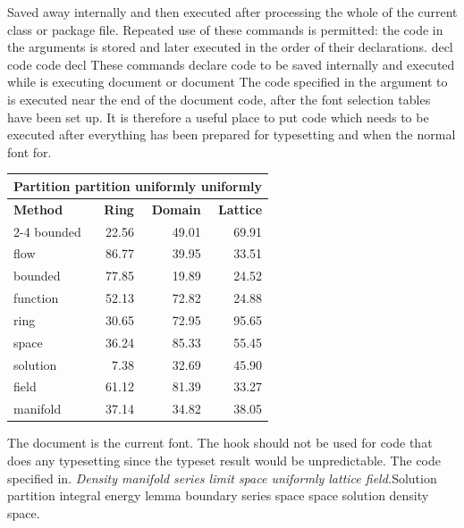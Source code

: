 \documentclass{article}
\begin{document}
Saved away internally and then executed after processing the whole of the current class or package file. Repeated use of these commands is permitted: the code in the arguments is stored and later executed in the order of their declarations. decl code code decl These commands declare code to be saved internally and executed while is executing document or document The code specified in the argument to is executed near the end of the document code, after the font selection tables have been set up. It is therefore a useful place to put code which needs to be executed after everything has been prepared for typesetting and when the normal font for.
{\centering
\begin{tabular}{l@{}rrr}
\hline
\multicolumn{4}{c}{\bfseries Partition partition uniformly uniformly} \\ \hline
\bfseries Method & \bfseries Ring & \bfseries Domain & \bfseries Lattice \\ \cline{2-4}
bounded & 22.56 & 49.01 & 69.91 \\
flow & 86.77 & 39.95 & 33.51 \\
bounded & 77.85 & 19.89 & 24.52 \\
function & 52.13 & 72.82 & 24.88 \\
ring & 30.65 & 72.95 & 95.65 \\
space & 36.24 & 85.33 & 55.45 \\
solution & 7.38 & 32.69 & 45.90 \\
field & 61.12 & 81.39 & 33.27 \\
manifold & 37.14 & 34.82 & 38.05 \\
\hline
\end{tabular}
\par}
\noindent The document is the current font. The hook should not be used for code that does any typesetting since the typeset result would be unpredictable. The code specified in. {\itshape Density manifold series limit space uniformly lattice field.}\hspace{.05\textwidth}Solution partition integral energy lemma boundary series space space solution density space.
\end{document}
